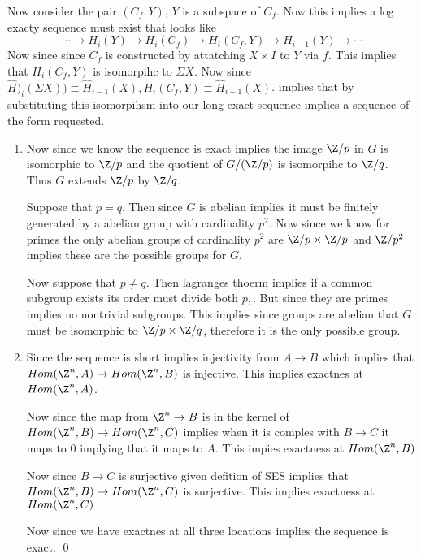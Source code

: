 \documentclass[12pt]{amsart}
\begin{document}
  \begin{problem}[Problem  3]
    Now consider the pair $(C_f, Y)$, $Y$ is a subspace of $C_f$. Now this implies a log exacty sequence must exist that looks like 
    \[\cdots \to H_i(Y)\to H_i(C_f)\to H_i(C_f, Y)\to H_{i-1}(Y)\to \cdots \]
    Now since since $C_f$ is constructed by attatching $X\times I$ to $Y$ via $f$. This implies that $H_i(C_f, Y)$ is isomorpihc to $\Sigma X$. Now since $\hat H)_i(\Sigma X))\equiv \hat H_{i-1}(X), H_i(C_f, Y)\equiv \hat H_{i-1}(X)$. implies that by substituting this isomorpihsm into our long exact sequence implies a sequence of the form requested.  
  \end{problem}

  \begin{problem}[Problem 4]
    \begin{enumerate}
      \item Now since we know the sequence is exact implies the image $\Z /p$ in $G$ is isomorphic to $\Z/p$ and the quotient of $G/(\Z/p)$ is isomorpihc to $\Z/q$. Thus $G$ extends $\Z/p$ by $\Z/q$. 

      Suppose that $p=q$. Then since $G$ is abelian implies it must be finitely generated by a abelian group with cardinality $p^2$. Now since we know for primes the only abelian groups of cardinality $p^2$ are $\Z/p \times \Z/p$ and $\Z/p^2$ implies these are the possible groups for $G$. 

      Now suppose that $p\neq q$. Then lagranges thoerm implies if a common subgroup exists its order must divide both $p,$. But since they are primes implies no nontrivial subgroups. This implies since groups are abelian that $G$ must be isomorphic to $\Z/p \times \Z/q$, therefore it is the only possible group.  
      
    \item 
      Since the sequence is short implies injectivity from $A\to B$ which implies that $Hom(\Z^n, A)\to Hom(\Z^n, B)$ is injective. This implies exactnes at $Hom(\Z^n, A)$.  
      
      Now since the map from $\Z^n\to B$ is in the kernel of $Hom(\Z^n, B)\to Hom(\Z^n, C)$ implies when it is comples with $B\to C$ it maps to 0 implying that it maps to $A$. This impies exactness at $Hom(\Z^n, B)$

      Now since $B\to C$ is surjective given defition of SES implies that $Hom(\Z^n, B)\to Hom(\Z^n, C)$ is surjective. This implies exactness at$Hom(\Z^n, C)$

      Now since we have exactnes at all three locations implies the sequence is exact. \qed  


\end{enumerate}
\end{problem}
\end{document}
